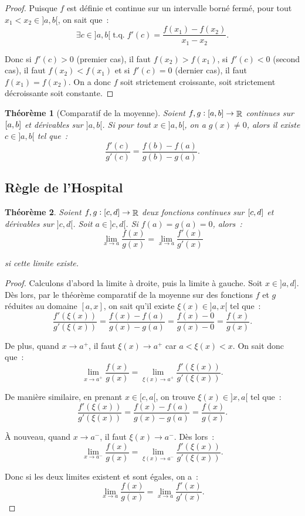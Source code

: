 \documentclass{article}
\DeclareMathOperator{\R}{\mathbb R}
\DeclareMathOperator{\tq}{ t.q. }
\newcommand{\ab}{\interval ab}
\newcommand{\fabr}[1]{#1 : \ab \to \R}
\newtheorem{thm}{Théorème}[section]
\theoremstyle{definition}
\theoremstyle{remark}
\begin{document}
		\begin{proof} Puisque $f$ est définie et continue sur un intervalle borné fermé, pour tout $x_1 < x_2 \in ]a, b[$, on sait que~:
		\[\exists c \in ]a, b[ \tq f'(c) = \frac {f(x_1)-f(x_2)}{x_1-x_2}.\]

		Donc si $f'(c) > 0$ (premier cas), il faut $f(x_2) > f(x_1)$, si $f'(c) < 0$ (second cas), il faut $f(x_2) < f(x_1)$ et si $f'(c) = 0$ (dernier cas), il faut
		$f(x_1) = f(x_2)$. On a donc $f$ soit strictement croissante, soit strictement décroissante soit constante. \end{proof}

		\begin{thm}[Comparatif de la moyenne] Soient $\fabr {f, g}$ continues sur $\ab$ et dérivables sur $]a, b[$. Si pour tout $x \in ]a, b[$, on a $g(x) \neq 0$,
		alors il existe $c \in ]a, b[$ tel que~:
		\[\frac {f'(c)}{g'(c)} = \frac {f(b)-f(a)}{g(b)-g(a)}.\]
		\end{thm}

	\subsection{Règle de l'Hospital}

		\begin{thm} Soient $f, g : \interval cd \to \R$ deux fonctions continues sur $\interval cd$ et dérivables sur $]c, d[$. Soit $a \in ]c, d[$.
		Si $f(a) = g(a) = 0$, alors~:
		\[\lim_{x \to a}\frac {f(x)}{g(x)} = \lim_{x \to a}\frac {f'(x)}{g'(x)}\]

		si cette limite existe. \end{thm}

		\begin{proof} Calculons d'abord la limite à droite, puis la limite à gauche. Soit $x \in ]a, d]$. Dès lors, par le théorème comparatif de la moyenne
		sur des fonctions $f$ et $g$ réduites au domaine $[a, x]$, on sait qu'il existe $\xi(x) \in ]a, x[$ tel que~:
		\[\frac {f'(\xi(x))}{g'(\xi(x))} = \frac {f(x)-f(a)}{g(x)-g(a)} = \frac {f(x)-0}{g(x)-0} = \frac {f(x)}{g(x)}.\]

		De plus, quand $x \to a^+$, il faut $\xi(x) \to a^+$ car $a < \xi(x) < x$. On sait donc que~:
		\[\lim_{x \to a^+}\frac {f(x)}{g(x)} = \lim_{\xi(x) \to a^+}\frac {f'(\xi(x))}{g'(\xi(x))}.\]

		De manière similaire, en prenant $x \in [c, a[$, on trouve $\xi(x) \in ]x, a[$ tel que~:
		\[\frac {f'(\xi(x))}{g'(\xi(x))} = \frac {f(x)-f(a)}{g(x)-g(a)} = \frac {f(x)}{g(x)}.\]

		À nouveau, quand $x \to a^-$, il faut $\xi(x) \to a^-$. Dès lors~:
		\[\lim_{x \to a^-}\frac {f(x)}{g(x)} = \lim_{\xi(x) \to a^-}\frac {f'(\xi(x))}{g'(\xi(x))}.\]

		Donc si les deux limites existent et sont égales, on a~:
		\[\lim_{x \to a}\frac {f(x)}{g(x)} = \lim_{x \to a}\frac {f'(x)}{g'(x)}.\]
		\end{proof}
\end{document}
